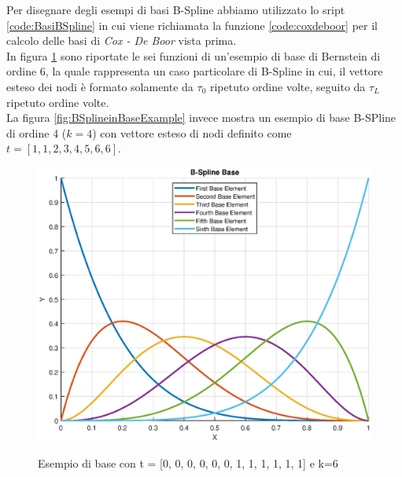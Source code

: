\documentclass[a4paper, 12pt]{article}
\begin{document}


Per disegnare degli esempi di basi B-Spline abbiamo utilizzato lo sript \ref{code:BasiBSpline} in cui viene richiamata la funzione \ref{code:coxdeboor} per il calcolo delle basi di \textit{Cox - De Boor} vista prima.\\
In figura \ref{fig:BernsteinBaseExample} sono riportate le sei funzioni di un'esempio di base di Bernstein di ordine 6, la quale rappresenta un caso particolare di B-Spline in cui, il vettore esteso dei nodi è formato solamente da $\tau_0$ ripetuto ordine volte, seguito da $\tau_L$ ripetuto ordine volte.\\
La figura \ref{fig:BSplineinBaseExample} invece mostra un esempio di base B-SPline di ordine 4 ($k = 4$) con vettore esteso di nodi definito come $t = [1, 1, 2, 3, 4, 5, 6, 6]$.



\begin{figure}[!]
	\centering
	\caption{Esempio di base con t = [0, 0, 0, 0, 0, 0, 1, 1, 1, 1, 1, 1] e k=6}
	\includegraphics[scale=0.7]{bezier_base_plot.eps}
	\label{fig:BernsteinBaseExample}
\end{figure}
\end{document}
